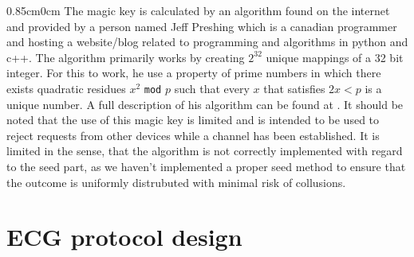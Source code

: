 \documentclass{article}
\newcommand{\code}[1]{\texttt{#1}}
\newcommand{\tWidth}{0.85cm}
\newcommand{\iPar}[1]{\begin{adjustwidth}{\tWidth}{0cm} #1 \end{adjustwidth}
}
\begin{document}
	\iPar{
		The magic key is calculated by an algorithm found on the internet and provided by a person named Jeff Preshing which is a canadian programmer and hosting a website/blog related to programming and algorithms in python and c++. The algorithm primarily works by creating $2^{32}$ unique mappings of a 32 bit integer. For this to work, he use a property of prime numbers in which there exists quadratic residues $x^2$ \code{mod} $p$ such that every $x$ that satisfies $2x < p$ is a unique number. A full description of his algorithm can be found at \cite{Preshing}. It should be noted that the use of this magic key is limited and is intended to be used to reject requests from other devices while a channel has been established. It is limited in the sense, that the algorithm is not correctly implemented with regard to the seed part, as we haven't implemented a proper seed method to ensure that the outcome is uniformly distrubuted with minimal risk of collusions. }
	
	
	\section{ECG protocol design}
	
\end{document}
